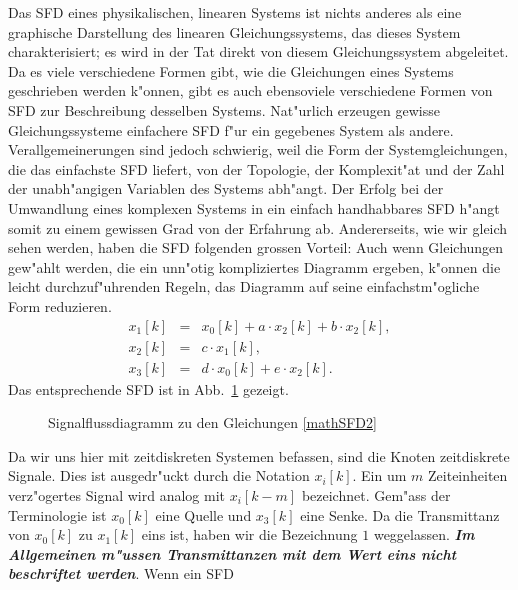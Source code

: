 \nit Das SFD eines physikalischen, linearen Systems ist nichts anderes
als eine graphische Darstellung des linearen Gleichungssystems, das
dieses System charakterisiert; es wird in der Tat direkt von diesem
Gleichungssystem abgeleitet. Da es viele verschiedene Formen gibt, wie
die Gleichungen eines Systems geschrieben werden k"onnen, gibt es auch
ebensoviele verschiedene Formen von SFD zur Beschreibung desselben
Systems.  Nat"urlich erzeugen gewisse Gleichungssysteme einfachere SFD
f"ur ein gegebenes System als andere.  Verallgemeinerungen sind jedoch
schwierig, weil die Form der Systemgleichungen, die das einfachste SFD
liefert, von der Topologie, der Komplexit"at und der
Zahl der unabh"angigen Variablen des Systems abh"angt. Der Erfolg bei
der Umwandlung eines komplexen Systems in ein einfach handhabbares SFD
h"angt somit zu einem gewissen Grad von der Erfahrung ab.
Andererseits, wie wir gleich sehen werden, haben die SFD folgenden
grossen Vorteil: Auch wenn Gleichungen gew"ahlt werden, die ein
unn"otig kompliziertes Diagramm ergeben, k"onnen die leicht
durchzuf"uhrenden Regeln, das Diagramm auf seine einfachstm"ogliche
Form reduzieren.\\  
\begin{eqnarray}
 x_1[k] & = & x_0[k] + a\cdot x_2[k] + b\cdot x_2[k], \nonumber \\
 x_2[k] & = & c\cdot x_1[k], \label{mathSFD2}\\ 
 x_3[k] & = & d\cdot x_0[k] + e\cdot x_2[k]. \nonumber
\end{eqnarray}
\nit Das entsprechende SFD ist in Abb.~\ref{SFD2} gezeigt.
\newpage
\begin{figure}[htb!]
\vspace*{-3mm}\begin{center}
  \caption{Signalflussdiagramm
    zu den Gleichungen \ref{mathSFD2}}\label{SFD2}
\end{center}
\vspace*{-7mm}
\end{figure}
\nit Da wir uns hier mit zeitdiskreten
Systemen befassen, sind die Knoten zeitdiskrete
Signale. Dies ist ausgedr"uckt durch die Notation
$x_i[k]$. Ein um $m$ Zeiteinheiten verz"ogertes Signal wird analog
mit $x_i[k-m]$ bezeichnet. Gem"ass der Terminologie ist $x_0[k]$ eine
Quelle und $x_3[k]$ eine Senke. Da die Transmittanz von $x_0[k]$
  zu $x_1[k]$ eins ist, haben wir die Bezeichnung $1$ weggelassen. {\it\textbf{Im Allgemeinen m"ussen Transmittanzen mit dem Wert eins nicht beschriftet werden}}. Wenn ein SFD

